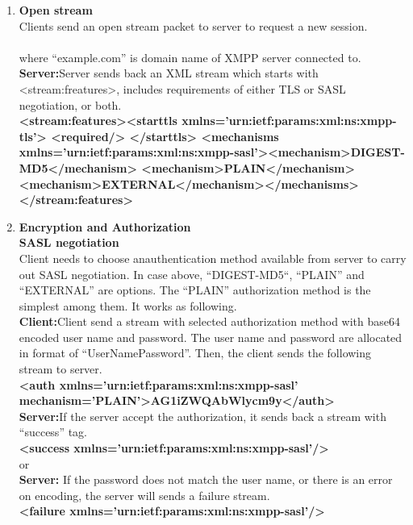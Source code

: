 \documentclass{SureshLimkar}
\begin{document}
\begin{enumerate}
 
 \item \textbf{Open stream}\\
  Clients send an open stream packet to server to request a new session.\\
 \\
where “example.com” is domain name of XMPP server connected to.\\
\textbf{Server:}Server sends back an XML stream which starts with <stream:freatures>, includes requirements of either TLS or SASL negotiation, or both.
\\
\textbf{<stream:features><starttls xmlns='urn:ietf:params:xml:ns:xmpp-tls'> <required/> </starttls> <mechanisms xmlns='urn:ietf:params:xml:ns:xmpp-sasl'><mechanism>DIGEST-MD5</mechanism> <mechanism>PLAIN</mechanism><mechanism>EXTERNAL</mechanism></mechanisms> </stream:features>}

\item \textbf{Encryption and Authorization}\\
\textbf{SASL negotiation}\\
Client needs to choose anauthentication method available from server to carry out SASL negotiation. In case above, “DIGEST-MD5“, “PLAIN” and “EXTERNAL” are options.
The “PLAIN” authorization method is the simplest among them. It works as following.
\\
\textbf{Client:}Client send a stream with selected authorization method with base64 encoded user name and password. The user name and password are allocated in format of “\0UserName\0Password”. Then, the client sends the following stream to server.
\\
\textbf{<auth xmlns='urn:ietf:params:xml:ns:xmpp-sasl' mechanism='PLAIN'>AG1iZWQAbWlycm9y</auth>}
\\
\textbf{Server:}If the server accept the authorization, it sends back a stream with “success” tag.
\\\textbf{<success xmlns='urn:ietf:params:xml:ns:xmpp-sasl'/>}
\\
or
\\
\textbf{Server:} If the password does not match the user name, or there is an error on encoding, the server will sends a failure stream.
\\
\textbf{<failure xmlns='urn:ietf:params:xml:ns:xmpp-sasl'/>}
\\


\end{enumerate}
\end{document}
